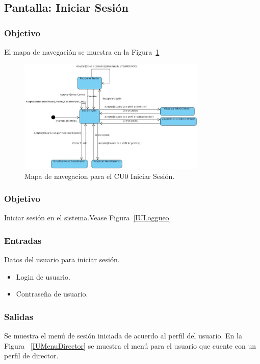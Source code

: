 \subsection{Pantalla: Iniciar Sesión}
\subsubsection{Objetivo}
	El mapa de navegación se muestra en la Figura~\ref{fig:mapaNavegacionCU0}

   \begin{figure}[hbpt!]
 		\centering
 			\includegraphics[width=0.8\textwidth]{images/cu0/MapaNavegacion.jpg}
 		\caption{Mapa de navegacion para el CU0 Iniciar Sesión.}
		\label{fig:mapaNavegacionCU0}
 	\end{figure}
\subsubsection{Objetivo}
Iniciar sesión en el sistema.Vease Figura~\ref{IULoggueo}


\subsubsection{Entradas}
Datos del usuario para iniciar sesión.
\begin{itemize}
\item Login de usuario.
\item Contraseña de usuario.
\end{itemize}

\subsubsection{Salidas}
Se muestra el menú de sesión iniciada de acuerdo al perfil del usuario.
En la Figura~ \ref{IUMenuDirector} se muestra el menú para el usuario que cuente con un perfil de director.

